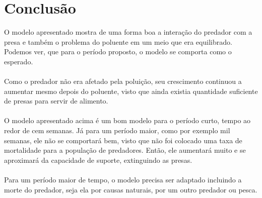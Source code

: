 \documentclass[a4paper]{article}
\begin{document}
\section{Conclus\~ao}
O modelo apresentado mostra de uma forma boa a intera\c{c}\~ao do predador com a presa e tamb\'em o problema do poluente em um meio que era equilibrado. Podemos ver, que para o per\'iodo proposto, o modelo se comporta como o esperado.
\\
\\
Como o predador n\~ao era afetado pela polui\c{c}\~ao, seu crescimento continuou a aumentar mesmo depois do poluente, visto que ainda existia quantidade suficiente de presas para servir de alimento.
\\
\\
O modelo apresentado acima \'e um bom modelo para o per\'iodo curto, tempo ao redor de cem semanas. J\'a para um per\'iodo maior, como por exemplo mil semanas, ele n\~ao se comportar\'a bem, visto que n\~ao foi colocado uma taxa de mortalidade para a popula\c{c}\~ao de predadores. Ent\~ao, ele aumentar\'a muito e se aproximar\'a da capacidade de suporte, extinguindo as presas.
\\
\\
Para um per\'iodo maior de tempo, o modelo precisa ser adaptado incluindo a morte do predador, seja ela por causas naturais, por um outro predador ou pesca.
\end{document}
